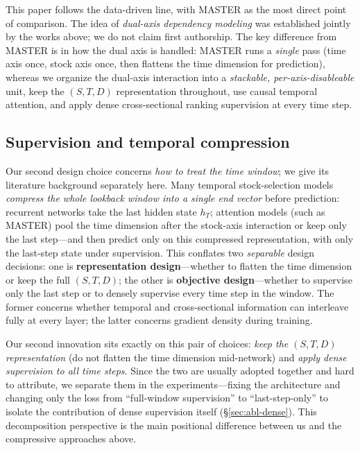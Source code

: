 \documentclass[a4paper,11pt]{article}
\begin{document}
This paper follows the data-driven line, with MASTER as the most direct point
of comparison. The idea of \emph{dual-axis dependency modeling} was established
jointly by the works above; we do not claim first authorship. The key
difference from MASTER is in how the dual axis is handled: MASTER runs a
\emph{single} pass (time axis once, stock axis once, then flattens the time
dimension for prediction), whereas we organize the dual-axis interaction into a
\emph{stackable, per-axis-disableable} unit, keep the $(S,T,D)$ representation
throughout, use causal temporal attention, and apply dense cross-sectional
ranking supervision at every time step.

\subsection{Supervision and temporal compression}\label{sec:rw-sup}
Our second design choice concerns \emph{how to treat the time window}; we give
its literature background separately here. Many temporal stock-selection models
\emph{compress the whole lookback window into a single end vector} before
prediction: recurrent networks take the last hidden state $h_T$; attention
models (such as MASTER) pool the time dimension after the stock-axis
interaction or keep only the last step---and then predict only on this
compressed representation, with only the last-step state under supervision.
This conflates two \emph{separable} design decisions: one is
\textbf{representation design}---whether to flatten the time dimension or keep
the full $(S,T,D)$; the other is \textbf{objective design}---whether to
supervise only the last step or to densely supervise every time step in the
window. The former concerns whether temporal and cross-sectional information
can interleave fully at every layer; the latter concerns gradient density
during training.

Our second innovation sits exactly on this pair of choices: \emph{keep the
$(S,T,D)$ representation} (do not flatten the time dimension mid-network) and
\emph{apply dense supervision to all time steps}. Since the two are usually
adopted together and hard to attribute, we separate them in the
experiments---fixing the architecture and changing only the loss from
``full-window supervision'' to ``last-step-only'' to isolate the contribution of
dense supervision itself (\S\ref{sec:abl-dense}). This decomposition
perspective is the main positional difference between us and the compressive
approaches above.
\end{document}
